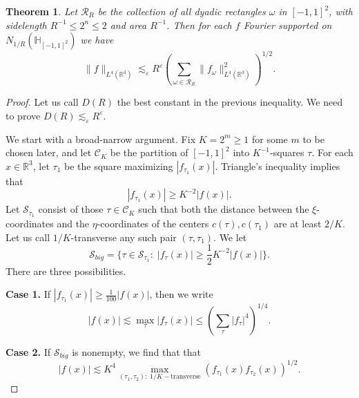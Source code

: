 \documentclass{amsart}%
\numberwithin{equation}{section}
\newtheorem{theorem}{Theorem}[section]
\newcommand{\e}{\varepsilon}
\newcommand{\ZH}{\mathbb{H}}
\newcommand{\cC}{{\mathcal C}}
\newcommand{\R}{\mathbb{R}}
\newcommand{\1}{\mathbbm{1}}
\begin{document}
    \begin{theorem}
    \label{GMOt}
    Let $\mathcal{R}_R$ be the collection of all dyadic rectangles $\omega$ in $[-1,1]^2$, with sidelength $R^{-1}\le 2^n\le 2$ and area $R^{-1}$. Then for each $f$ Fourier supported on $N_{1/R}(\ZH_{[-1,1]^2})$ we have
    $$\|f\|_{L^4(\R^3)}\lesssim_\e R^\e(\sum_{\omega\in\mathcal{R}_R}\|f_\omega\|_{L^4(\R^3)}^2)^{1/2}.$$
    \end{theorem}
	\begin{proof}
    Let us call $D(R)$ the best constant in the previous inequality. We need to prove $D(R)\lesssim_\e R^{\e}$.
    
    We start with a broad-narrow argument.
    Fix $K=2^m\ge 1$ for some $m$ to be chosen later, and let $\cC_K$ be the partition of $[-1,1]^2$ into $K^{-1}$-squares $\tau$. 
    For each $x\in\R^3$, let $\tau_1$ be the square maximizing $|f_{\tau_1}(x)|$. Triangle's inequality implies that
    $$|f_{\tau_1}(x)|\ge K^{-2}|f(x)|.$$
    Let $\mathcal{S}_{\tau_1}$ consist of those $\tau\in\mathcal{C}_K$ such that both the distance between the $\xi$-coordinates and the $\eta$-coordinates of the centers $c(\tau),c(\tau_1)$  are at least $2/K$. 
    Let us call  $1/K$-transverse any such pair $(\tau,\tau_1)$.
    We let
    $$\mathcal{S}_{big}=\{\tau\in\mathcal{S}_{\tau_1}:\;|f_\tau(x)|\ge \frac12K^{-2}|f(x)|\}.$$
    There are three possibilities.
    \medskip

    {\bf Case 1.} If $|f_{\tau_1}(x)|\ge \frac{1}{100}|f(x)|$, then we write
    \begin{equation}
    \label{kjhhrfhrghurhguhrgiuh1}
    |f(x)|\lesssim \max_{\tau}|f_\tau(x)|\le (\sum_{\tau}|f_{\tau}|^4)^{1/4}.
    \end{equation}
    \medskip

    {\bf Case 2.} If $\mathcal{S}_{big}$ is nonempty, we find that that\begin{equation}
    \label{kjhhrfhrghurhguhrgiuh2}
|f(x)|\lesssim K^4\max_{(\tau_1,\tau_2):\;1/K-\text{transverse}}(f_{\tau_1}(x)f_{\tau_2}(x))^{1/2}.
    \end{equation}
    \medskip


\end{proof}
\end{document}
